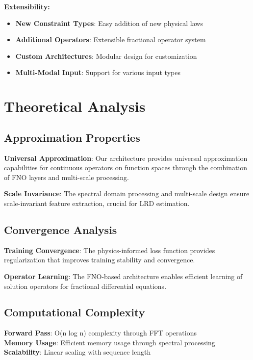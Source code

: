 \documentclass[11pt,a4paper]{article}
\begin{document}
\textbf{Extensibility:}
\begin{itemize}
    \item \textbf{New Constraint Types}: Easy addition of new physical laws
    \item \textbf{Additional Operators}: Extensible fractional operator system
    \item \textbf{Custom Architectures}: Modular design for customization
    \item \textbf{Multi-Modal Input}: Support for various input types
\end{itemize}

\section{Theoretical Analysis}

\subsection{Approximation Properties}

\textbf{Universal Approximation}: Our architecture provides universal approximation capabilities for continuous operators on function spaces through the combination of FNO layers and multi-scale processing.

\textbf{Scale Invariance}: The spectral domain processing and multi-scale design ensure scale-invariant feature extraction, crucial for LRD estimation.

\subsection{Convergence Analysis}

\textbf{Training Convergence}: The physics-informed loss function provides regularization that improves training stability and convergence.

\textbf{Operator Learning}: The FNO-based architecture enables efficient learning of solution operators for fractional differential equations.

\subsection{Computational Complexity}

\textbf{Forward Pass}: O(n log n) complexity through FFT operations \\
\textbf{Memory Usage}: Efficient memory usage through spectral processing \\
\textbf{Scalability}: Linear scaling with sequence length
\end{document}
